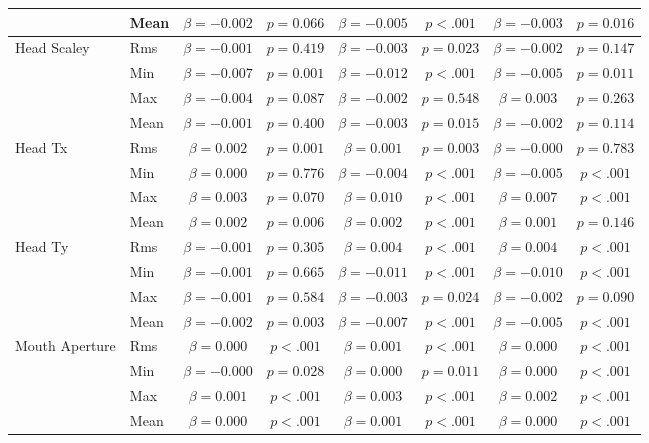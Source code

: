 \begin{tabular}{llcc|cc|cc}
 & Mean & $\beta = -0.002$ & $p = 0.066$ & $\beta = -0.005$ & $p < .001$ & $\beta = -0.003$ & $p = 0.016$ \\
\midrule
\multirow{4}{*}{Head Scaley} & Rms & $\beta = -0.001$ & $p = 0.419$ & $\beta = -0.003$ & $p = 0.023$ & $\beta = -0.002$ & $p = 0.147$ \\
 & Min & $\beta = -0.007$ & $p = 0.001$ & $\beta = -0.012$ & $p < .001$ & $\beta = -0.005$ & $p = 0.011$ \\
 & Max & $\beta = -0.004$ & $p = 0.087$ & $\beta = -0.002$ & $p = 0.548$ & $\beta = 0.003$ & $p = 0.263$ \\
 & Mean & $\beta = -0.001$ & $p = 0.400$ & $\beta = -0.003$ & $p = 0.015$ & $\beta = -0.002$ & $p = 0.114$ \\
\midrule
\multirow{4}{*}{Head Tx} & Rms & $\beta = 0.002$ & $p = 0.001$ & $\beta = 0.001$ & $p = 0.003$ & $\beta = -0.000$ & $p = 0.783$ \\
 & Min & $\beta = 0.000$ & $p = 0.776$ & $\beta = -0.004$ & $p < .001$ & $\beta = -0.005$ & $p < .001$ \\
 & Max & $\beta = 0.003$ & $p = 0.070$ & $\beta = 0.010$ & $p < .001$ & $\beta = 0.007$ & $p < .001$ \\
 & Mean & $\beta = 0.002$ & $p = 0.006$ & $\beta = 0.002$ & $p < .001$ & $\beta = 0.001$ & $p = 0.146$ \\
\midrule
\multirow{4}{*}{Head Ty} & Rms & $\beta = -0.001$ & $p = 0.305$ & $\beta = 0.004$ & $p < .001$ & $\beta = 0.004$ & $p < .001$ \\
 & Min & $\beta = -0.001$ & $p = 0.665$ & $\beta = -0.011$ & $p < .001$ & $\beta = -0.010$ & $p < .001$ \\
 & Max & $\beta = -0.001$ & $p = 0.584$ & $\beta = -0.003$ & $p = 0.024$ & $\beta = -0.002$ & $p = 0.090$ \\
 & Mean & $\beta = -0.002$ & $p = 0.003$ & $\beta = -0.007$ & $p < .001$ & $\beta = -0.005$ & $p < .001$ \\
\midrule
\multirow{4}{*}{Mouth Aperture} & Rms & $\beta = 0.000$ & $p < .001$ & $\beta = 0.001$ & $p < .001$ & $\beta = 0.000$ & $p < .001$ \\
 & Min & $\beta = -0.000$ & $p = 0.028$ & $\beta = 0.000$ & $p = 0.011$ & $\beta = 0.000$ & $p < .001$ \\
 & Max & $\beta = 0.001$ & $p < .001$ & $\beta = 0.003$ & $p < .001$ & $\beta = 0.002$ & $p < .001$ \\
 & Mean & $\beta = 0.000$ & $p < .001$ & $\beta = 0.001$ & $p < .001$ & $\beta = 0.000$ & $p < .001$ \\

\end{tabular}
